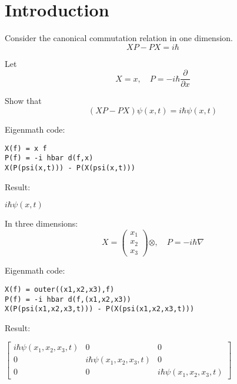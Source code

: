 

\section*{Introduction}

Consider the canonical commutation relation in one dimension.
\begin{equation*}
XP-PX=i\hbar
\end{equation*}

Let
\begin{equation*}
X=x,\quad P=-i\hbar\frac{\partial}{\partial x}
\end{equation*}

Show that
\begin{equation*}
(XP-PX)\psi(x,t)=i\hbar\psi(x,t)
\end{equation*}

Eigenmath code:
{\color{blue}
\begin{verbatim}
X(f) = x f
P(f) = -i hbar d(f,x)
X(P(psi(x,t))) - P(X(psi(x,t)))
\end{verbatim}}

Result:

\bigskip
$i\hbar\psi(x,t)$

\bigskip
In three dimensions:
\begin{equation*}
X=\begin{pmatrix}x_1\\x_2\\x_3\end{pmatrix}\otimes,\quad P=-i\hbar\nabla
\end{equation*}

Eigenmath code:
{\color{blue}
\begin{verbatim}
X(f) = outer((x1,x2,x3),f)
P(f) = -i hbar d(f,(x1,x2,x3))
X(P(psi(x1,x2,x3,t))) - P(X(psi(x1,x2,x3,t)))
\end{verbatim}}

Result:

\bigskip
$\begin{bmatrix}
i\hbar\psi(x_1,x_2,x_3,t)&0&0\\
0&i\hbar\psi(x_1,x_2,x_3,t)&0\\
0&0&i\hbar\psi(x_1,x_2,x_3,t)
\end{bmatrix}
$


